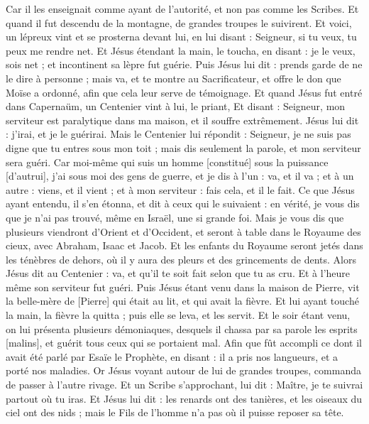 \begin{multicols}{2}
Car il les enseignait comme ayant de l'autorité, et non pas comme les Scribes.
\VerseOne{}Et quand il fut descendu de la montagne, de grandes troupes le suivirent.
Et voici, un lépreux vint et se prosterna devant lui, en lui disant : Seigneur, si tu veux, tu peux me rendre net.
Et Jésus étendant la main, le toucha, en disant : je le veux, sois net ; et incontinent sa lèpre fut guérie.
Puis Jésus lui dit : prends garde de ne le dire à personne ; mais va, et te montre au Sacrificateur, et offre le don que Moïse a ordonné, afin que cela leur serve de témoignage.
Et quand Jésus fut entré dans Capernaüm, un Centenier vint à lui, le priant,
Et disant : Seigneur, mon serviteur est paralytique dans ma maison, et il souffre extrêmement.
Jésus lui dit : j'irai, et je le guérirai.
Mais le Centenier lui répondit : Seigneur, je ne suis pas digne que tu entres sous mon toit ; mais dis seulement la parole, et mon serviteur sera guéri.
Car moi-même qui suis un homme [constitué] sous la puissance [d'autrui], j'ai sous moi des gens de guerre, et je dis à l'un : va, et il va ; et à un autre : viens, et il vient ; et à mon serviteur : fais cela, et il le fait.
Ce que Jésus ayant entendu, il s'en étonna, et dit à ceux qui le suivaient : en vérité, je vous dis que je n'ai pas trouvé, même en Israël, une si grande foi.
Mais je vous dis que plusieurs viendront d'Orient et d'Occident, et seront à table dans le Royaume des cieux, avec Abraham, Isaac et Jacob.
Et les enfants du Royaume seront jetés dans les ténèbres de dehors, où il y aura des pleurs et des grincements de dents.
Alors Jésus dit au Centenier : va, et qu'il te soit fait selon que tu as cru. Et à l'heure même son serviteur fut guéri.
Puis Jésus étant venu dans la maison de Pierre, vit la belle-mère de [Pierre] qui était au lit, et qui avait la fièvre.
Et lui ayant touché la main, la fièvre la quitta ; puis elle se leva, et les servit.
Et le soir étant venu, on lui présenta plusieurs démoniaques, desquels il chassa par sa parole les esprits [malins], et guérit tous ceux qui se portaient mal.
Afin que fût accompli ce dont il avait été parlé par Esaïe le Prophète, en disant : il a pris nos langueurs, et a porté nos maladies.
Or Jésus voyant autour de lui de grandes troupes, commanda de passer à l'autre rivage.
Et un Scribe s'approchant, lui dit : Maître, je te suivrai partout où tu iras.
Et Jésus lui dit : les renards ont des tanières, et les oiseaux du ciel ont des nids ; mais le Fils de l'homme n'a pas où il puisse reposer sa tête.

\end{multicols}
